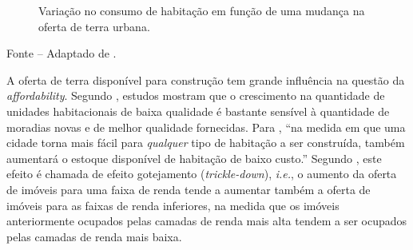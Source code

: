 \documentclass[
	12pt,				%
	oneside,			%
	a4paper,			%
	chapter=TITLE,		%
	section=TITLE,		%
	english,			%
	brazil				%
	]{abntex2}
\newcommand{\bcenter}{\begin{center}}
\newcommand{\ecenter}{\end{center}}
\begin{document}
\begin{refsection}
\begin{figure}[H]
{}

\caption{Variação no consumo de habitação em função de uma mudança na oferta de terra urbana.}\label{fig:ofertaTerra}
\end{figure}
\bcenter

Fonte -- Adaptado de \textcite[p.~253]{bertaud}.
\ecenter

A oferta de terra disponível para construção tem grande influência na questão da
\emph{affordability}. Segundo \textcite[p.~205]{quigley}, estudos mostram que o crescimento na
quantidade de unidades habitacionais de baixa qualidade é bastante sensível à
quantidade de moradias novas e de melhor qualidade fornecidas. Para
\textcite{MalpezziandGreen1996}, ``na medida em que uma cidade torna mais fácil para
\emph{qualquer} tipo de habitação a ser construída, também aumentará o estoque
disponível de habitação de baixo custo.'' Segundo \textcite[p.~239-240]{bertaud}, este
efeito é chamada de efeito gotejamento (\emph{trickle-down}), \emph{i.e.}, o aumento da
oferta de imóveis para uma faixa de renda tende a aumentar também a oferta de
imóveis para as faixas de renda inferiores, na medida que os imóveis
anteriormente ocupados pelas camadas de renda mais alta tendem a ser ocupados
pelas camadas de renda mais baixa.


\end{refsection}
\end{document}
